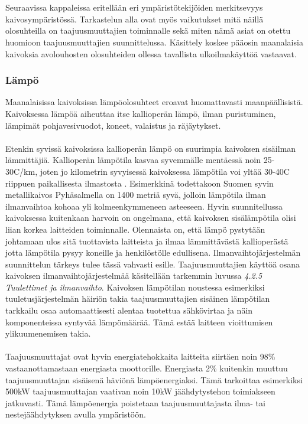 \documentclass[finnish,12pt,a4paper,pdftex,elec,utf8]{aaltothesis}
\begin{document}
\\\\
Seuraavissa kappaleissa eritellään eri ympäristötekijöiden merkitsevyys kaivosympäristössä. Tarkastelun alla ovat myös vaikutukset mitä näillä olosuhteilla on taajuusmuuttajien toiminnalle sekä miten nämä asiat on otettu huomioon taajuusmuuttajien suunnittelussa. Käsittely koskee pääosin maanalaisia kaivoksia avolouhosten olosuhteiden ollessa tavallista ulkoilmakäyttöä vastaavat. %

\subsubsection{Lämpö}
Maanalaisissa kaivoksissa lämpöolosuhteet eroavat huomattavasti maanpäällisistä. Kaivoksessa lämpöä aiheuttaa itse kallioperän lämpö, ilman puristuminen, lämpimät pohjavesivuodot, koneet, valaistus ja räjäytykset\cite[s.305]{Hakapää}. 
\\\\
Etenkin syvissä kaivoksissa kallioperän lämpö on suurimpia kaivoksen sisäilman lämmittäjiä. Kallioperän lämpötila kasvaa syvemmälle mentäessä noin 25-30\textdegree C/km, joten jo kilometrin syvyisessä kaivoksessa lämpötila voi yltää 30-40\textdegree C riippuen paikallisesta ilmastosta \cite[s. 62]{maanlampo}. %
Esimerkkinä todettakoon Suomen syvin metallikaivos Pyhäsalmella on 1400 metriä syvä, jolloin lämpötila ilman ilmanvaihtoa kohoaa yli kolmeenkymmeneen asteeseen. Hyvin suunnitellussa kaivoksessa kuitenkaan harvoin on ongelmana, että kaivoksen sisälämpötila olisi liian korkea laitteiden toiminnalle. Olennaista on, että lämpö pystytään johtamaan ulos sitä tuottavista laitteista ja ilmaa lämmittävästä kallioperästä jotta lämpötila pysyy koneille ja henkilöstölle edullisena. Ilmanvaihtojärjestelmän suunnittelun tärkeys tulee tässä vahvasti esille. Taajuusmuuttajien käyttöä osana kaivoksen ilmanvaihtojärjestelmää käsitellään tarkemmin luvussa \textit{4.2.5 Tuulettimet ja ilmanvaihto}. Kaivoksen lämpötilan noustessa esimerkiksi tuuletusjärjestelmän häiriön takia taajuusmuuttajien sisäinen lämpötilan tarkkailu osaa automaattisesti alentaa tuotettua sähkövirtaa ja näin komponenteissa syntyvää lämpömäärää. Tämä estää laitteen vioittumisen ylikuumenemisen takia.
\\\\
Taajuusmuuttajat ovat hyvin energiatehokkaita laitteita siirtäen noin 98\% vastaanottamastaan energiasta moottorille\cite{ABBinmining}. Energiasta 2\% kuitenkin muuttuu taajuusmuuttajan sisäisenä häviönä lämpöenergiaksi. Tämä tarkoittaa esimerkiksi 500kW taajuusmuuttajan vaativan noin 10kW jäähdytystehon toimiakseen jatkuvasti. Tämä lämpöenergia poistetaan taajuusmuuttajasta ilma- tai nestejäähdytyksen avulla ympäristöön.
 
\end{document}
